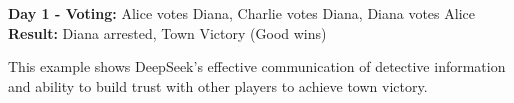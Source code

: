 \documentclass{article}
\begin{document}
\begin{resultbox}
\textbf{Day 1 - Voting:} Alice votes Diana, Charlie votes Diana, Diana votes Alice\\
\textbf{Result:} Diana arrested, Town Victory (Good wins)
\end{resultbox}

This example shows DeepSeek's effective communication of detective information and ability to build trust with other players to achieve town victory.
\end{document}
